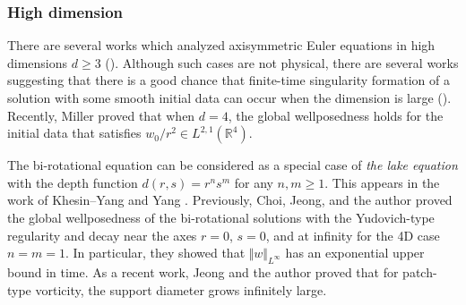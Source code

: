 \documentclass[11pt]{amsart}
\theoremstyle{definition}
\theoremstyle{remark}
\numberwithin{equation}{section}
\numberwithin{equation}{section}
\newcommand{\nrm}[1]{\Vert#1\Vert}
\newcommand{\0}{\emptyset}
\newcommand{\ift}{\infty}
\newcommand{\bbR}{\mathbb R}
\begin{document}
	
	
	
	
	\subsubsection{High dimension}
	
	There are several works which analyzed axisymmetric Euler equations in high dimensions $d\geq3$ (\cite{CJLglobal22, Limglobal23, GMT2023}). Although such cases are not physical, there are several works suggesting that there is a good chance that finite-time singularity formation of a solution with some smooth initial data can occur when the dimension is large (\cite{DE, Miller, HouZhang22P1, HouZhang22P2}). Recently, Miller \cite{Miller26prep} proved that when $d=4$, the global wellposedness holds for the initial data that satisfies $w_{0}/r^{2}\in L^{2,1}(\bbR^{4})$.
	
	The bi-rotational equation can be considered as a special case of \textit{the lake equation} with the depth function $d(r,s)=r^{n}s^{m}$ for any $n,m\geq1$. This appears in the work of Khesin--Yang \cite{KhYa} and Yang \cite{Yang}. Previously, Choi, Jeong, and the author \cite{CJL_gwpbi} proved the global wellposedness of the bi-rotational solutions with the Yudovich-type regularity and decay near the axes $r=0$, $s=0$, and at infinity for the 4D case $n=m=1$. In particular, they showed that $\nrm{w}_{L^{\ift}}$ has an exponential upper bound in time. As a recent work, Jeong and the author \cite{JL25} proved that for patch-type vorticity, the support diameter grows infinitely large.
	
	
	
\end{document}
